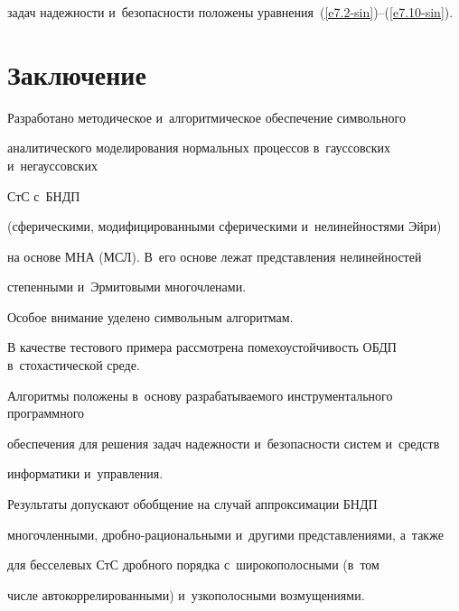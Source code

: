 задач надежности и~безопасности положены уравнения~(\ref{e7.2-sin})--(\ref{e7.10-sin}).



\section{Заключение}



Разработано методическое и~алгоритмическое  обеспечение символьного 

аналитического моделирования нормальных процессов в~гауссовских и~негауссовских 

СтС с~БНДП

(сферическими, модифицированными сферическими и~нелинейностями Эйри) 

на основе МНА (МСЛ). В~его основе лежат представления нелинейностей 

степенными и~Эрмитовыми многочленами.

Особое внимание уделено символьным алгоритмам.



В качестве тестового примера рассмотрена помехоустойчивость ОБДП в~стохастической среде.



Алгоритмы положены в~основу разрабатываемого инструментального программного 

обеспечения для решения задач надежности и~безопасности систем и~средств 

информатики и~управления.



Результаты допускают обобщение на случай аппроксимации БНДП

многочленными, дроб\-но-ра\-ци\-о\-наль\-ны\-ми и~другими представлениями, а~также 

для бесселевых СтС дробного порядка с~широкополосными (в~том 

числе автокоррелированными) и~узкополосными возмущениями.




